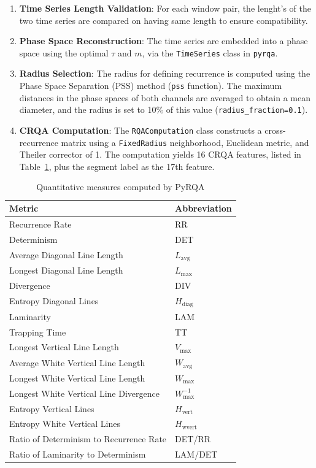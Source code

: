 \documentclass{article}
\begin{document}
				\begin{enumerate}
				    \item \textbf{Time Series Length Validation}: For each window pair, the lenght's of the two time series are compared on having same length to ensure compatibility.
				    \item \textbf{Phase Space Reconstruction}: The time series are embedded into a phase space using the optimal \(\tau\) and \(m\), via the \texttt{TimeSeries} class in \texttt{pyrqa}.
				    \item \textbf{Radius Selection}: The radius for defining recurrence is computed using the Phase Space Separation (PSS) method (\texttt{pss} function). The maximum distances in the phase spaces of both channels are averaged to obtain a mean diameter, and the radius is set to 10\% of this value (\texttt{radius\_fraction=0.1}).
				    \item \textbf{CRQA Computation}: The \texttt{RQAComputation} class constructs a cross-recurrence matrix using a \texttt{FixedRadius} neighborhood, Euclidean metric, and Theiler corrector of 1. The computation yields 16 CRQA features, listed in Table~\ref{tab:pyrqa_metrics}, plus the segment label as the 17th feature.
				\end{enumerate}

				\begin{table}[h]
				\centering
				\caption{Quantitative measures computed by PyRQA}
				\label{tab:pyrqa_metrics}
				\begin{tabular}{ll}
				\toprule
				\textbf{Metric} & \textbf{Abbreviation} \\
				\midrule
				Recurrence Rate & RR \\
				Determinism & DET \\
				Average Diagonal Line Length & \(L_{\text{avg}}\) \\
				Longest Diagonal Line Length & \(L_{\text{max}}\) \\
				Divergence & DIV \\
				Entropy Diagonal Lines & \(H_{\text{diag}}\) \\
				Laminarity & LAM \\
				Trapping Time & TT \\
				Longest Vertical Line Length & \(V_{\text{max}}\) \\
				Average White Vertical Line Length & \(W_{\text{avg}}\) \\
				Longest White Vertical Line Length & \(W_{\text{max}}\) \\
				Longest White Vertical Line Divergence & \(W_{\text{max}}^{-1}\) \\
				Entropy Vertical Lines & \(H_{\text{vert}}\) \\
				Entropy White Vertical Lines & \(H_{\text{wvert}}\) \\
				Ratio of Determinism to Recurrence Rate & DET/RR \\
				Ratio of Laminarity to Determinism & LAM/DET \\
				\bottomrule
				\end{tabular}
				\end{table}
\end{document}
